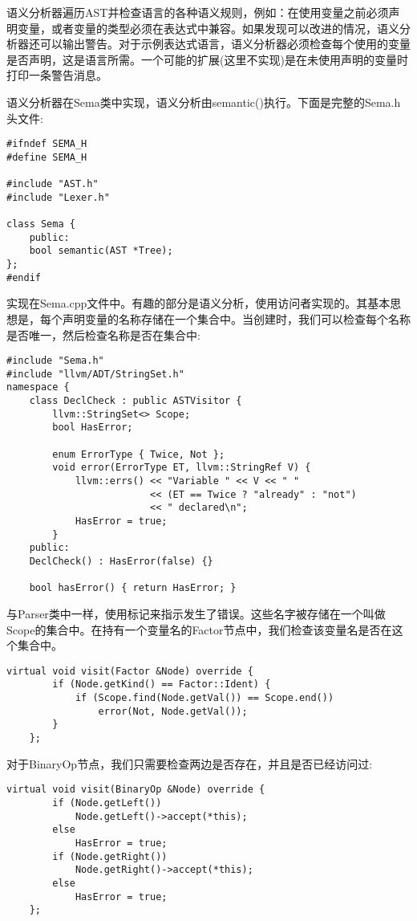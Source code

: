 语义分析器遍历AST并检查语言的各种语义规则，例如：在使用变量之前必须声明变量，或者变量的类型必须在表达式中兼容。如果发现可以改进的情况，语义分析器还可以输出警告。对于示例表达式语言，语义分析器必须检查每个使用的变量是否声明，这是语言所需。一个可能的扩展(这里不实现)是在未使用声明的变量时打印一条警告消息。\par

语义分析器在Sema类中实现，语义分析由semantic()执行。下面是完整的Sema.h头文件:\par

\begin{lstlisting}[caption={}]
#ifndef SEMA_H
#define SEMA_H

#include "AST.h"
#include "Lexer.h"

class Sema {
	public:
	bool semantic(AST *Tree);
};
#endif
\end{lstlisting}

实现在Sema.cpp文件中。有趣的部分是语义分析，使用访问者实现的。其基本思想是，每个声明变量的名称存储在一个集合中。当创建时，我们可以检查每个名称是否唯一，然后检查名称是否在集合中:

\begin{lstlisting}[caption={}]
#include "Sema.h"
#include "llvm/ADT/StringSet.h"
namespace {
	class DeclCheck : public ASTVisitor {
		llvm::StringSet<> Scope;
		bool HasError;
		
		enum ErrorType { Twice, Not };
		void error(ErrorType ET, llvm::StringRef V) {
			llvm::errs() << "Variable " << V << " "
						 << (ET == Twice ? "already" : "not")
						 << " declared\n";
			HasError = true;
		}
	public:
	DeclCheck() : HasError(false) {}
	
	bool hasError() { return HasError; }
\end{lstlisting}

与Parser类中一样，使用标记来指示发生了错误。这些名字被存储在一个叫做Scope的集合中。在持有一个变量名的Factor节点中，我们检查该变量名是否在这个集合中。

\begin{lstlisting}[caption={}]
	virtual void visit(Factor &Node) override {
		if (Node.getKind() == Factor::Ident) {
			if (Scope.find(Node.getVal()) == Scope.end())
				error(Not, Node.getVal());
		}
	};
\end{lstlisting}

对于BinaryOp节点，我们只需要检查两边是否存在，并且是否已经访问过:

\begin{lstlisting}[caption={}]
	virtual void visit(BinaryOp &Node) override {
		if (Node.getLeft())
			Node.getLeft()->accept(*this);
		else
			HasError = true;
		if (Node.getRight())
			Node.getRight()->accept(*this);
		else
			HasError = true;
	};
\end{lstlisting}


